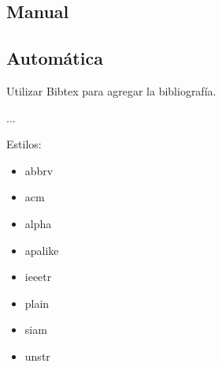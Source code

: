 \documentclass[]{article}
\begin{document}
\subsection{Manual}
%

\subsection{Automática}
Utilizar Bibtex para agregar la bibliografía.

\cite{bishop1994neural}...

Estilos:
\begin{itemize}
	\item abbrv
	\item acm
	\item alpha
	\item apalike
	\item ieeetr
	\item plain
	\item siam
	\item unstr
\end{itemize}




\end{document}

